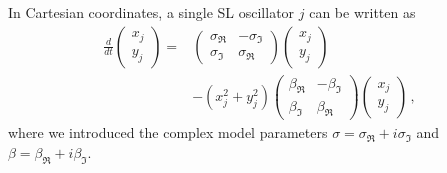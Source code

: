 \documentclass[aps,showpacs,preprintnumbers,amsmath,amssymb,twocolumn,superscriptaddress,floatfix,nofootinbib,10pt,pre]{revtex4-1}
\begin{document}
In Cartesian coordinates, a single SL oscillator $j$ can be written as
\begin{align}\label{eq:SL}
\frac{d}{dt}
\begin{pmatrix}
 x_j\\y_j
\end{pmatrix} =&
\begin{pmatrix}
 \sigma_{\Re} & -\sigma_{\Im}\\
 \sigma_{\Im} & \sigma_{\Re}
\end{pmatrix}
\begin{pmatrix}
 x_j\\y_j
\end{pmatrix}\nonumber\\
&-  (x_j^2+y_j^2)
\begin{pmatrix}
 \beta_{\Re} & -\beta_{\Im}\\
 \beta_{\Im} & \beta_{\Re}
\end{pmatrix}
\begin{pmatrix}
 x_j\\y_j
\end{pmatrix}\, ,
\end{align}
where we introduced the complex model parameters $\sigma=\sigma_{\Re}+i\sigma_{\Im}$ and $\beta=\beta_{\Re}+i\beta_{\Im}$. 
\end{document}
